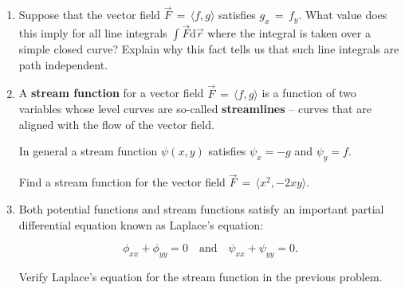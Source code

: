 \documentclass{amsart}
\begin{document}
\begin{enumerate}
\vfill

\item Suppose that the vector field $\vec{F} \, = \, \langle f, g \rangle$ satisfies $g_x \, = \, f_y$.  What value does this imply for all line integrals $\int \vec{F} \mbox{d}\vec{r}$ where the integral is taken over a simple closed curve?  Explain why this fact tells us that such line integrals are path independent.

\vfill

\newpage

\item A {\bf stream function} for a vector field $\vec{F} \, = \, \langle f, g \rangle$ is a function of two variables whose level curves are so-called {\bf streamlines} -- curves that are aligned with the flow of the vector field.

In general a stream function $\psi(x,y)$ satisfies $\psi_x = -g$ and $\psi_y = f$.  

Find a stream function for the vector field $\vec{F} \, = \, \langle x^2, -2xy \rangle$.

\vfill

\item Both potential functions and stream functions satisfy an important partial differential equation known as Laplace's equation:

\[ \phi_{xx} + \phi_{yy} = 0 \quad \mbox{and} \quad  \psi_{xx} + \psi_{yy} = 0.  \]

Verify Laplace's equation for the stream function in the previous problem.

\vfill

\end{enumerate}
\end{document}
